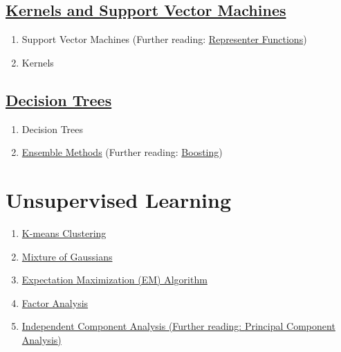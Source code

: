 \documentclass{article}
\begin{document}
\subsection{\href{https://github.com/scpd-proed/XCS229-Handouts/blob/main/Kernels\%20and\%20Support\%20Vector\%20Machines.pdf}{Kernels and Support Vector Machines}}
\vspace{-2.5mm}
\begin{enumerate}
  \setlength\itemsep{-0.25em}
  \item Support Vector Machines (Further reading: \href{https://github.com/scpd-proed/XCS229-Handouts/blob/main/Representer\%20Functions.pdf}{Representer Functions})
  \item Kernels
\end{enumerate}
\vspace{-2.5mm}
\subsection{\href{https://github.com/scpd-proed/XCS229-Handouts/blob/main/Decision\%20Trees.pdf}{Decision Trees}}
\vspace{-2.5mm}
\begin{enumerate}
  \setlength\itemsep{-0.25em}
  \item Decision Trees
  \item \href{https://github.com/scpd-proed/XCS229-Handouts/blob/main/Ensemble\%20Methods.pdf}{Ensemble Methods} (Further reading: \href{https://github.com/scpd-proed/XCS229-Handouts/blob/main/Boosting.pdf}{Boosting})
\end{enumerate}
\vspace{-2.5mm}
\section{Unsupervised Learning}
\vspace{-2.5mm}
\begin{enumerate}
  \setlength\itemsep{-0.25em}
  \item \href{https://github.com/scpd-proed/XCS229-Handouts/blob/main/K-Means\%20Clustering.pdf}{K-means Clustering}
  \item \href{https://github.com/scpd-proed/XCS229-Handouts/blob/main/Mixture\%20of\%20Gaussians.pdf}{Mixture of Gaussians}
  \item \href{https://github.com/scpd-proed/XCS229-Handouts/blob/main/Expectation\%20Maximization\%20Algorithm.pdf}{Expectation Maximization (EM) Algorithm}
  \item \href{https://github.com/scpd-proed/XCS229-Handouts/blob/main/Factor\%20Analysis.pdf}{Factor Analysis}
  \item \href{https://github.com/scpd-proed/XCS229-Handouts/blob/main/Independent\%20Component\%20Analysis.pdf}{Independent Component Analysis (Further reading: \href{https://github.com/scpd-proed/XCS229-Handouts/blob/main/Principal\%20Component\%20Analysis.pdf}{Principal Component Analysis})}
\end{enumerate}
\vspace{-2.5mm}
\end{document}
